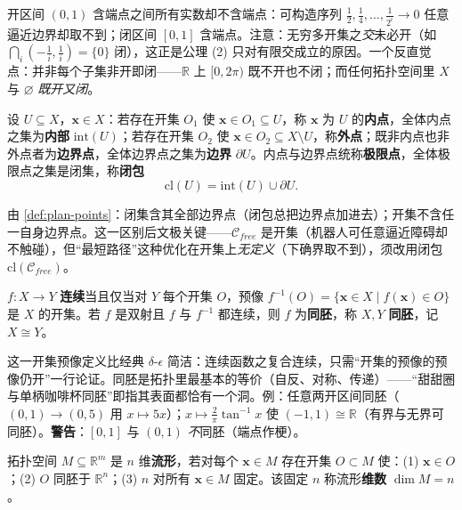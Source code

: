 \noindent 开区间 $(0,1)$ 含端点之间所有实数却不含端点：可构造序列 $\tfrac12,\tfrac14,\dots,\tfrac1{2^i}\to0$ 任意逼近边界却取不到；闭区间 $[0,1]$ 含端点。注意：无穷多开集之\emph{交}未必开（如 $\bigcap_i(-\tfrac1i,\tfrac1i)=\{0\}$ 闭），这正是公理 (2) 只对有限交成立的原因。一个反直觉点：并非每个子集非开即闭——$\mathbb{R}$ 上 $[0,2\pi)$ 既不开也不闭；而任何拓扑空间里 $X$ 与 $\varnothing$ \emph{既开又闭}。

\begin{definition}[特殊点与闭包]\label{def:plan-points}
设 $U\subseteq X$，$\mathbf{x}\in X$：若存在开集 $O_1$ 使 $\mathbf{x}\in O_1\subseteq U$，称 $\mathbf{x}$ 为 $U$ 的\textbf{内点}，全体内点之集为\textbf{内部} $\mathrm{int}(U)$；若存在开集 $O_2$ 使 $\mathbf{x}\in O_2\subseteq X\setminus U$，称\textbf{外点}；既非内点也非外点者为\textbf{边界点}，全体边界点之集为\textbf{边界} $\partial U$。内点与边界点统称\textbf{极限点}，全体极限点之集是闭集，称\textbf{闭包}
\begin{equation}
  \mathrm{cl}(U)=\mathrm{int}(U)\cup\partial U.
  \label{eq:plan-closure}
\end{equation}
\end{definition}

\noindent 由 \cref{def:plan-points}：闭集含其全部边界点（闭包总把边界点加进去）；开集不含任一自身边界点。这一区别后文极关键——$\mathcal{C}_{free}$ 是开集（机器人可任意逼近障碍却不触碰），但“最短路径”这种优化在开集上\emph{无定义}（下确界取不到），须改用闭包 $\mathrm{cl}(\mathcal{C}_{free})$。

\begin{definition}[连续与同胚]\label{def:plan-homeo}
$f:X\to Y$ \textbf{连续}当且仅当对 $Y$ 每个开集 $O$，预像 $f^{-1}(O)=\{\mathbf{x}\in X\mid f(\mathbf{x})\in O\}$ 是 $X$ 的开集。若 $f$ 是双射且 $f$ 与 $f^{-1}$ 都连续，则 $f$ 为\textbf{同胚}，称 $X,Y$ \textbf{同胚}，记 $X\cong Y$。
\end{definition}

\noindent 这一开集预像定义比经典 $\delta$-$\epsilon$ 简洁：连续函数之复合连续，只需“开集的预像的预像仍开”一行论证。同胚是拓扑里最基本的等价（自反、对称、传递）——“甜甜圈与单柄咖啡杯同胚”即指其表面都恰有一个洞。例：任意两开区间同胚（$(0,1)\to(0,5)$ 用 $x\mapsto5x$）；$x\mapsto\tfrac2\pi\tan^{-1}x$ 使 $(-1,1)\cong\mathbb{R}$（有界与无界可同胚）。\textbf{警告}：$[0,1]$ 与 $(0,1)$ \emph{不}同胚（端点作梗）。

\begin{definition}[流形]\label{def:plan-manifold}
拓扑空间 $M\subseteq\mathbb{R}^m$ 是 $n$ 维\textbf{流形}，若对每个 $\mathbf{x}\in M$ 存在开集 $O\subset M$ 使：(1) $\mathbf{x}\in O$；(2) $O$ 同胚于 $\mathbb{R}^n$；(3) $n$ 对所有 $\mathbf{x}\in M$ 固定。该固定 $n$ 称流形\textbf{维数} $\dim M=n$。
\end{definition}

